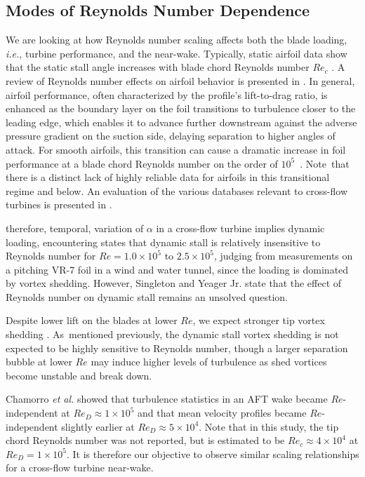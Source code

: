 \documentclass[energies,article,accept,moreauthors,pdftex,10pt,a4paper]{mdpi}
\theoremstyle{mdpi}
\newcounter{ex}
\newcounter{re}
\begin{document}
\subsection{Modes of Reynolds Number Dependence}

We are looking at how Reynolds number scaling affects both the blade loading,
\emph{i.e.}, turbine performance, and the near-wake. Typically, static airfoil data
show that the static stall angle increases with blade chord Reynolds number
$Re_c$ \cite{Jacobs1937}. A review of Reynolds number effects on airfoil
behavior is presented in \cite{Lissaman1983}. In general, airfoil
performance, often characterized by the profile's lift-to-drag ratio, is
enhanced as the boundary layer on the foil transitions to turbulence closer to
the leading edge, which enables it to advance further downstream against the
adverse pressure gradient on the suction side, delaying separation to higher
angles of attack. For smooth airfoils, this transition can cause a dramatic
increase in foil performance at a blade chord Reynolds number on the order of
\mbox{$10^5$ \cite{McMasters1980}}. Note~that there is a distinct lack of highly
reliable data for airfoils in this transitional regime and below. An evaluation
of the various databases relevant to cross-flow turbines is presented in
\cite{Bedon2014}.

 therefore, temporal, variation of $\alpha$ in a cross-flow
turbine implies dynamic loading, encountering  states that dynamic stall is relatively
insensitive to Reynolds number for $Re=1.0 \times 10^5$ to $2.5 \times
10^5$, judging from measurements on a pitching VR-7 foil in a wind and water
tunnel, since the loading is dominated by vortex shedding. However, Singleton
and Yeager Jr. \cite{Singleton2000} state that the effect of Reynolds number on
dynamic stall remains an unsolved question.

Despite lower lift on the blades at lower $Re$, we expect stronger tip vortex
shedding \cite{Yoon2005}. As~mentioned previously, the dynamic stall vortex
shedding is not expected to be highly sensitive to Reynolds number, though a
larger separation bubble at lower $Re$ may induce higher levels of turbulence as
shed vortices become unstable and break down. 

Chamorro \emph{et al.} \cite{Chamorro2012} showed that turbulence statistics in an AFT%
wake became $Re$-independent at $Re_D \approx 1 \times 10^5$ and that mean
velocity profiles became $Re$-independent slightly earlier at $Re_D \approx 5
\times 10^4$. Note that in this study, the tip chord Reynolds number was not
reported, but is estimated to be $Re_c \approx 4 \times 10^4$ at $Re_D=1 \times
10^5$. It is therefore our objective to observe similar scaling relationships
for a cross-flow turbine near-wake.
\end{document}
